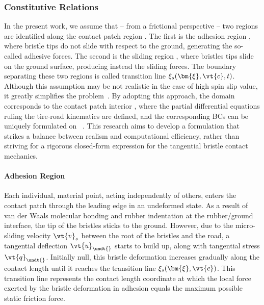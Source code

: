 
\subsubsection{Constitutive Relations}
\label{app3:sec:constitutive_relations}

In the present work, we assume that -- from a frictional perspective -- two regions are identified along the contact patch region \cp{}. The first is the adhesion region \adh{}, where bristle tips do not slide with respect to the ground, generating the so-called adhesive forces. The second is the sliding region \sli{}, where bristles tips slide on the ground surface, producing instead the sliding forces. The boundary separating these two regions is called transition line $\xi_s(\bm{\xi},\vt{c},t)$. Although this assumption may be not realistic in the case of high spin slip value, it greatly simplifies the problem~\cite{romano2022advanced}. By adopting this approach, the domain corresponds to the contact patch interior , where the partial differential equations ruling the tire-road kinematics are defined, and the corresponding \acp{BC} can be uniquely formulated on ~\cite{romano2022analytical}. This research aims to develop a formulation that strikes a balance between realism and computational efficiency, rather than striving for a rigorous closed-form expression for the tangential bristle contact mechanics.

\paragraph{Adhesion Region}

Each individual, material point, acting independently of others,  enters the contact patch through the leading edge in an undeformed state.  As a result of van der Waals molecular bonding and rubber indentation at the rubber/ground interface, the tip of the bristles sticks to the ground. However, due to the micro-sliding velocity $\vt{v}_s$ between the root of the bristles and the road, a tangential deflection $\vt{u}_{\undt{}
}$ starts to build up, along with tangential stress $\vt{q}_{\undt{}
}$. Initially null, this bristle deformation increases gradually along the contact length until it reaches the transition line $\xi_s(\bm{\xi},\vt{c})$. This transition line represents the contact length coordinate at which the local force exerted by the bristle deformation in adhesion equals the maximum possible static friction force.

